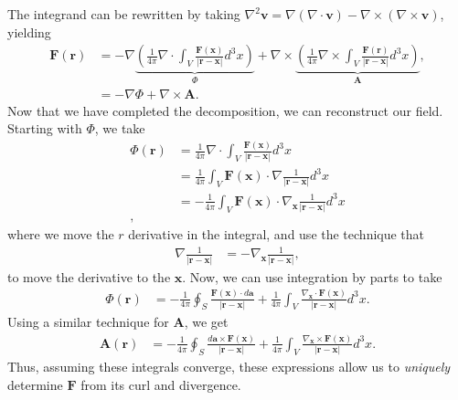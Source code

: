 \documentclass[10pt]{mypackage}
\begin{document}
The integrand can be rewritten by taking $\nabla^2\mathbf{v} = \nabla\left(\nabla \cdot \mathbf{v}\right) - \nabla\times\left(\nabla\times\mathbf{v}\right)$, yielding
\begin{align*}
  \mathbf{F}\left(\mathbf{r}\right) &= -\nabla\underbrace{\left(\frac{1}{4\pi}\nabla \cdot \int_{V}\frac{\mathbf{F}\left(\mathbf{x}\right)}{\left\vert \mathbf{r}-\mathbf{x} \right\vert}d^3x\right)}_{\Phi} + \nabla \times \underbrace{\left(\frac{1}{4\pi}\nabla \times \int_{V}\frac{\mathbf{F}\left(\mathbf{r}\right)}{\left\vert \mathbf{r} - \mathbf{x} \right\vert}d^3x\right)}_{\mathbf{A}},\\
                                    &= -\nabla\Phi + \nabla \times \mathbf{A}.
\end{align*}
Now that we have completed the decomposition, we can reconstruct our field. Starting with $\Phi$, we take
\begin{align*}
  \Phi\left(\mathbf{r}\right) &= \frac{1}{4\pi}\nabla \cdot \int_{V}\frac{\mathbf{F}\left(\mathbf{x}\right)}{\left\vert \mathbf{r}-\mathbf{x} \right\vert}d^3x\\
                              &= \frac{1}{4\pi} \int_{V}\mathbf{F}\left(\mathbf{x}\right)\cdot\nabla \frac{1}{\left\vert \mathbf{r}-\mathbf{x} \right\vert}d^3x\\
                              &= -\frac{1}{4\pi} \int_{V}\mathbf{F}\left(\mathbf{x}\right)\cdot\nabla_{\mathbf{x}} \frac{1}{\left\vert \mathbf{r}-\mathbf{x} \right\vert}d^3x\\,
\end{align*}
where we move the $r$ derivative in the integral, and use the technique that
\begin{align*}
  \nabla\frac{1}{\left\vert \mathbf{r}-\mathbf{x} \right\vert} &= -\nabla_{\mathbf{x}}\frac{1}{\left\vert \mathbf{r}-\mathbf{x} \right\vert},
\end{align*}
to move the derivative to the $\mathbf{x}$. Now, we can use integration by parts to take
\begin{align*}
  \Phi\left(\mathbf{r}\right) &= -\frac{1}{4\pi}\oint_{S}\frac{\mathbf{F}\left(\mathbf{x}\right)\cdot d\mathbf{a}}{\left\vert \mathbf{r} - \mathbf{x} \right\vert} + \frac{1}{4\pi}\int_{V}\frac{\nabla_{\mathbf{x}}\cdot \mathbf{F}\left(\mathbf{x}\right)}{\left\vert \mathbf{r} - \mathbf{x} \right\vert}d^3x.
\end{align*}
Using a similar technique for $\mathbf{A}$, we get
\begin{align*}
  \mathbf{A}\left(\mathbf{r}\right) &= -\frac{1}{4\pi}\oint_{S}\frac{d\mathbf{a}\times \mathbf{F}\left(\mathbf{x}\right)}{\left\vert \mathbf{r} - \mathbf{x} \right\vert} + \frac{1}{4\pi}\int_{V}\frac{\nabla_{\mathbf{x}}\times \mathbf{F}\left(\mathbf{x}\right)}{\left\vert \mathbf{r} - \mathbf{x} \right\vert}d^3x.
\end{align*}
Thus, assuming these integrals converge, these expressions allow us to \textit{uniquely} determine $\mathbf{F}$ from its curl and divergence.\newline
\end{document}
